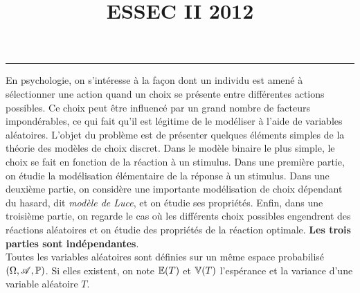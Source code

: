 \documentclass[11pt]{article}%
\title{\bf \vspace{-1cm} ESSEC II 2012} %
\author{} %
\date{} %
\begin{document}
\maketitle %
\vspace{-1.2cm}\hrule %
\thispagestyle{fancy}

\vspace*{.4cm}










\noindent
En psychologie, on s'intéresse à la fa\c con dont un individu est 
amené à sélectionner une action quand un choix se présente entre 
différentes actions possibles. Ce choix peut être influencé par un 
grand nombre de facteurs impondérables, ce qui fait qu'il est 
légitime de le modéliser à l'aide de variables aléatoires. 
L'objet du problème est de présenter quelques éléments simples 
de la théorie des modèles de choix discret. Dans le modèle binaire 
le plus simple, le choix se fait en fonction de la réaction à un 
stimulus. Dans une première partie, on étudie la modélisation 
élémentaire de la réponse à un stimulus. Dans une deuxième 
partie, on considère une importante modélisation de choix 
dépendant du hasard, dit {\it modèle de Luce}, et on étudie ses 
propriétés. Enfin, dans une troisième partie, on regarde le cas 
o\`u les différents choix possibles engendrent des réactions 
aléatoires et on étudie des propriétés de la réaction 
optimale.  {\bf Les trois parties sont indépendantes}.\\

\noindent
Toutes les variables aléatoires sont définies sur un même espace 
probabilisé $(\Omega , \mathscr{A} , \mathbb{P})$. Si elles existent, on note $\mathbb{E}(T)$ 
et $\mathbb{V}(T)$ l'espérance et la variance d'une variable aléatoire $T$.
\end{document}
